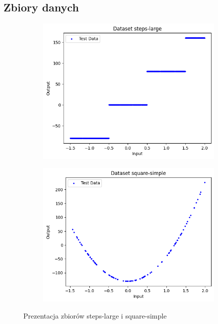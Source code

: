 \documentclass{article}
\begin{document}
\subsection*{Zbiory danych}
\begin{figure}[H]
    \centering
    \begin{subfigure}[b]{0.45\textwidth}
        \centering
        \includegraphics[width=\textwidth]{img/nn1/steps-large.png}
        \label{fig:steps-large}
    \end{subfigure}
    \hfill
    \begin{subfigure}[b]{0.45\textwidth}
        \centering
        \includegraphics[width=\textwidth]{img/nn1/square-simple.png}
        \label{fig:square-simple}
    \end{subfigure}
    \caption{Prezentacja zbiorów steps-large i square-simple}
\end{figure}
\end{document}
